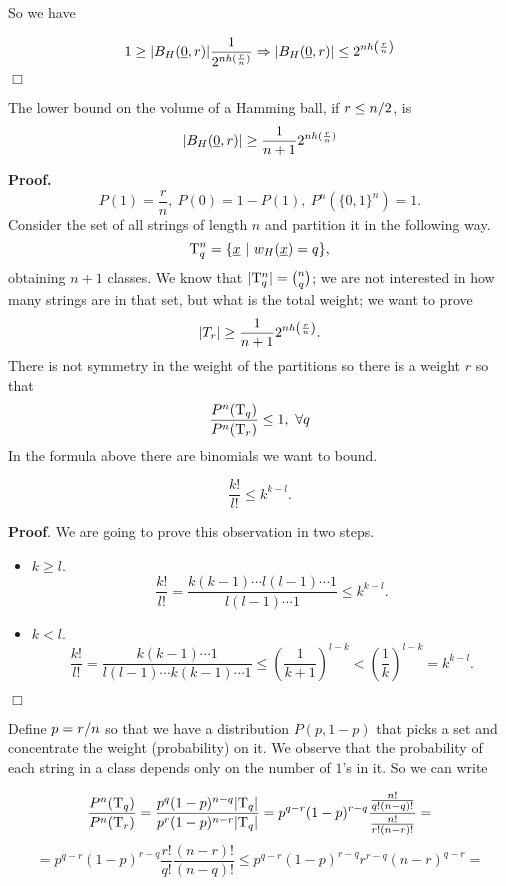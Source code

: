 So we have 

\[1 \geq |B_H(\underline{0}, r)| \dfrac{1}{2^{nh(\frac{r}{n})}} \Rightarrow |B_H(\underline{0}, r)| \leq 2^{nh\left(\frac{r}{n}\right)}\] 
\hfill$\Box$


\begin{thm}
	The lower bound on the volume of a Hamming ball, if $ r \leq {n}/{2}$, is
	$$|B_H(\underline{0}, r)| \geq \dfrac{1}{n+1}2^{nh(\frac{r}{n})}$$
\end{thm}

\noindent\textbf{Proof.} $$P(1) = \dfrac{r}{n},\ P(0) = 1 - P(1),\ P^n(\{0, 1\}^n) = 1.$$
Consider the set of all strings of length $n$ and partition it in the following way.
$$\mathrm{T}_q^n = \{\underline{x}\ |\ w_H(\underline{x}) = q\},$$
obtaining $n +1$ classes. 
We know that $|\mathrm{T}_q^n| = \binom{n}{q}$; we are not interested in how many strings are in that set, but what is the total weight; we want to prove $$ |T_r| \geq \dfrac{1}{n+1}2^{nh\left(\frac{r}{n}\right)}.$$ There is not symmetry in the weight of the partitions so there is a weight $r$ so that
$$ \dfrac{P^n(\mathrm{T}_q)}{P^n(\mathrm{T}_r)} \leq 1,\ \forall q$$
In the formula above there are binomials we want to bound.

\begin{obs}
	$$\dfrac{k!}{l!} \leq k^{k-l}.$$
\end{obs}

\noindent\textbf{Proof}. We are going to prove this observation in two steps.
\begin{itemize}
	\item $k \geq l$. 
		$$\dfrac{k!}{l!} = \dfrac{k(k-1) \cdots l(l -1) \cdots 1}{l(l -1) \cdots 1} \leq k^{k-l}.$$
		
	\item $k < l$.
		$$\dfrac{k!}{l!} = \dfrac{k(k-1) \cdots 1}{l(l -1) \cdots k(k-1) \cdots 1} \leq \left(\dfrac{1}{k+1}\right)^{l-k} < \left(\dfrac{1}{k}\right)^{l-k} = k^{k-l}.$$
\end{itemize}
\hfill$\Box$

Define $p = {r}/{n}$  so that we have a distribution $P(p, 1-p)$ that picks a set and concentrate the weight (probability) on it. We observe that the probability of each string in a class depends only on the number of $1$'s in it. So we can write

\[\dfrac{P^n(\mathrm{T}_q)}{P^n(\mathrm{T}_r)} = \dfrac{p^q(1-p)^{n-q}|\mathrm{T}_q|}{p^r(1-p)^{n-r}|\mathrm{T}_q|} = p^{q-r}(1-p)^{r-q} \dfrac{\frac{n!}{q!(n-q)!}}{\frac{n!}{r!(n-r)!}} = \]
\[ = p^{q-r}(1-p)^{r-q}\dfrac{r!}{q!}\dfrac{(n-r)!}{(n-q)!} \leq p^{q-r}(1-p)^{r-q}r^{r-q}(n-r)^{q-r} = \]

